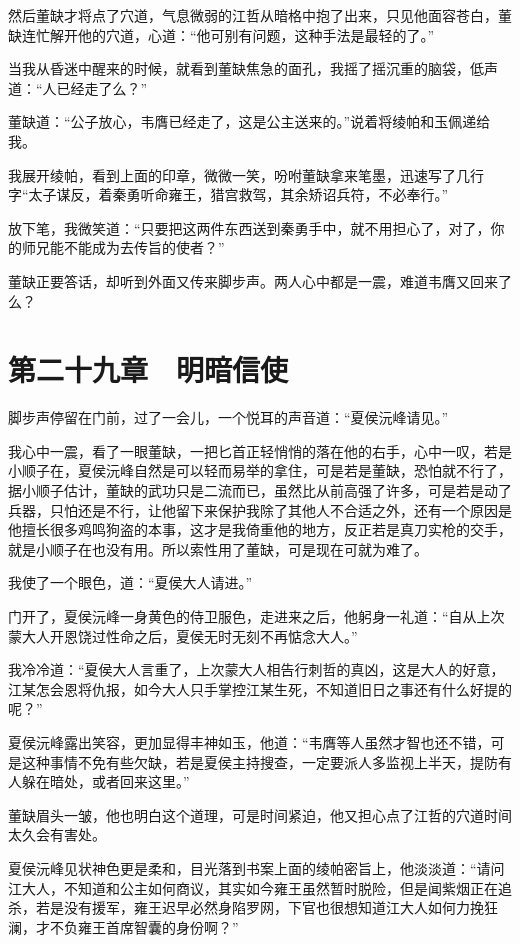 然后董缺才将点了穴道，气息微弱的江哲从暗格中抱了出来，只见他面容苍白，董缺连忙解开他的穴道，心道：“他可别有问题，这种手法是最轻的了。”

当我从昏迷中醒来的时候，就看到董缺焦急的面孔，我摇了摇沉重的脑袋，低声道：“人已经走了么？”

董缺道：“公子放心，韦膺已经走了，这是公主送来的。”说着将绫帕和玉佩递给我。

我展开绫帕，看到上面的印章，微微一笑，吩咐董缺拿来笔墨，迅速写了几行字“太子谋反，着秦勇听命雍王，猎宫救驾，其余矫诏兵符，不必奉行。”

放下笔，我微笑道：“只要把这两件东西送到秦勇手中，就不用担心了，对了，你的师兄能不能成为去传旨的使者？”

董缺正要答话，却听到外面又传来脚步声。两人心中都是一震，难道韦膺又回来了么？

\chapter{第二十九章　明暗信使}

脚步声停留在门前，过了一会儿，一个悦耳的声音道：“夏侯沅峰请见。”

我心中一震，看了一眼董缺，一把匕首正轻悄悄的落在他的右手，心中一叹，若是小顺子在，夏侯沅峰自然是可以轻而易举的拿住，可是若是董缺，恐怕就不行了，据小顺子估计，董缺的武功只是二流而已，虽然比从前高强了许多，可是若是动了兵器，只怕还是不行，让他留下来保护我除了其他人不合适之外，还有一个原因是他擅长很多鸡鸣狗盗的本事，这才是我倚重他的地方，反正若是真刀实枪的交手，就是小顺子在也没有用。所以索性用了董缺，可是现在可就为难了。

我使了一个眼色，道：“夏侯大人请进。”

门开了，夏侯沅峰一身黄色的侍卫服色，走进来之后，他躬身一礼道：“自从上次蒙大人开恩饶过性命之后，夏侯无时无刻不再惦念大人。”

我冷冷道：“夏侯大人言重了，上次蒙大人相告行刺哲的真凶，这是大人的好意，江某怎会恩将仇报，如今大人只手掌控江某生死，不知道旧日之事还有什么好提的呢？”

夏侯沅峰露出笑容，更加显得丰神如玉，他道：“韦膺等人虽然才智也还不错，可是这种事情不免有些欠缺，若是夏侯主持搜查，一定要派人多监视上半天，提防有人躲在暗处，或者回来这里。”

董缺眉头一皱，他也明白这个道理，可是时间紧迫，他又担心点了江哲的穴道时间太久会有害处。

夏侯沅峰见状神色更是柔和，目光落到书案上面的绫帕密旨上，他淡淡道：“请问江大人，不知道和公主如何商议，其实如今雍王虽然暂时脱险，但是闻紫烟正在追杀，若是没有援军，雍王迟早必然身陷罗网，下官也很想知道江大人如何力挽狂澜，才不负雍王首席智囊的身份啊？”

